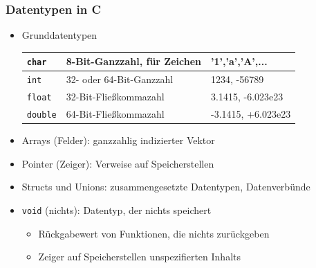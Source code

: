 \documentclass{slides}
\begin{document}
\begin{frame}[fragile]
  \frametitle{Datentypen in C}
  \begin{itemize}
  \item \alert{Grunddatentypen}

    \begin{center}
      \renewcommand{\arraystretch}{1.2}
      \begin{tabular}{|l|l|l|}
        \hline
        \lstinline!char! & 8-Bit-Ganzzahl, für Zeichen & '1','a','A',... \\\hline
        \lstinline!int! & 32- oder 64-Bit-Ganzzahl & 1234, -56789\\\hline
        \lstinline!float! & 32-Bit-Fließkommazahl & 3.1415, -6.023e23\\\hline
        \lstinline!double! & 64-Bit-Fließkommazahl & -3.1415, +6.023e23\\\hline
      \end{tabular}
    \end{center}

  \item \alert{Arrays} (Felder): ganzzahlig indizierter Vektor
  \item \alert{Pointer} (Zeiger): Verweise auf Speicherstellen
  \item \alert{Structs und Unions}: zusammengesetzte Datentypen, Datenverbünde
  \item {\alerted \lstinline!void!} (nichts): Datentyp, der nichts speichert
    \begin{itemize}
    \item Rückgabewert von Funktionen, die nichts zurückgeben
    \item Zeiger auf Speicherstellen unspezifierten Inhalts
    \end{itemize}
  \end{itemize}
\end{frame}
\end{document}
